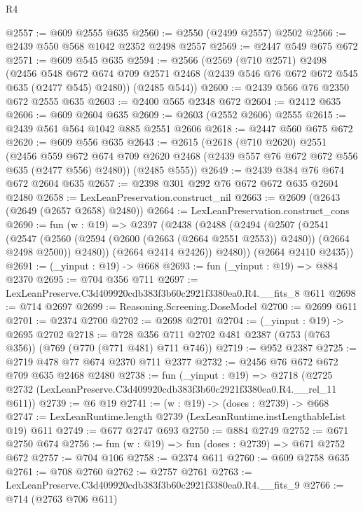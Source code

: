 \begin{lexlean}{R4}
\begin{coremodule}
@2557 := @609 @2555 @635
@2560 := @2550 (@2499 @2557) @2502
@2566 := @2439 @550 @568 @1042 @2352 @2498 @2557
@2569 := @2447 @549 @675 @672
@2571 := @609 @545 @635
@2594 := @2566
    (@2569
      (@710 @2571)
      @2498
      (@2456
        @548
        @672
        @674
        @709
        @2571
        @2468
        (@2439 @546 @76 @672 @672 @545 @635 (@2477 @545) @2480))
      (@2485 @544))
@2600 := @2439 @566 @76 @2350 @672 @2555 @635
@2603 := @2400 @565 @2348 @672
@2604 := @2412 @635
@2606 := @609 @2604 @635
@2609 := @2603 (@2552 @2606) @2555
@2615 := @2439 @561 @564 @1042 @885 @2551 @2606
@2618 := @2447 @560 @675 @672
@2620 := @609 @556 @635
@2643 := @2615
    (@2618
      (@710 @2620)
      @2551
      (@2456
        @559
        @672
        @674
        @709
        @2620
        @2468
        (@2439 @557 @76 @672 @672 @556 @635 (@2477 @556) @2480))
      (@2485 @555))
@2649 := @2439 @384 @76 @674 @672 @2604 @635
@2657 := @2398 @301 @292 @76 @672 @672 @635 @2604 @2480
@2658 := LexLeanPreservation.construct_nil
@2663 := @2609 (@2643 (@2649 (@2657 @2658) @2480))
@2664 := LexLeanPreservation.construct_cons
@2690 := fun (w : @19) =>
  @2397
    (@2438
      (@2488
        (@2494
          (@2507
            (@2541
              (@2547
                (@2560 (@2594 (@2600 (@2663 (@2664 @2551 @2553)) @2480)) (@2664 @2498 @2500))
                @2480))
            (@2664 @2414 @2426))
          @2480))
      (@2664 @2410 @2435))
@2691 := (_yinput : @19) -> @668
@2693 := fun (_yinput : @19) => @884 @2370
@2695 := @704 @356 @711
@2697 := LexLeanPreserve.C3d409920cdb383f3b60c2921f3380ea0.R4.__fits_8 @611
@2698 := @714 @2697
@2699 := Reasoning.Screening.DoseModel
@2700 := @2699 @611
@2701 := @2374 @2700
@2702 := @2698 @2701
@2704 := (_yinput : @19) -> @2695 @2702
@2718 := @728 @356 @711 @2702 @481 @2387 (@753 (@763 @356)) (@769 (@770 (@771 @481) @711 @746))
@2719 := @952 @2387
@2725 := @2719 @478 @77 @674 @2370 @711 @2377
@2732 := @2456 @76 @672 @672 @709 @635 @2468 @2480
@2738 := fun (_yinput : @19) =>
  @2718 (@2725 @2732 (LexLeanPreserve.C3d409920cdb383f3b60c2921f3380ea0.R4.__rel_11 @611))
@2739 := @6 @19
@2741 := (w : @19) -> (doses : @2739) -> @668
@2747 := LexLeanRuntime.length @2739 (LexLeanRuntime.instLengthableList @19) @611
@2749 := @677 @2747 @693
@2750 := @884 @2749
@2752 := @671 @2750 @674
@2756 := fun (w : @19) => fun (doses : @2739) => @671 @2752 @672
@2757 := @704 @106
@2758 := @2374 @611
@2760 := @609 @2758 @635
@2761 := @708 @2760
@2762 := @2757 @2761
@2763 := LexLeanPreserve.C3d409920cdb383f3b60c2921f3380ea0.R4.__fits_9
@2766 := @714 (@2763 @706 @611)

\end{coremodule}
\end{lexlean}
